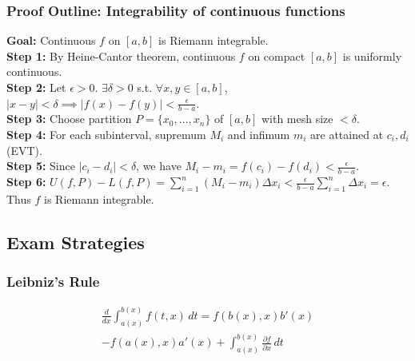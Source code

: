 \subsubsection{Proof Outline: Integrability of continuous functions}
\textbf{Goal:} Continuous $f$ on $[a,b]$ is Riemann integrable. \\
\textbf{Step 1:} By Heine-Cantor theorem, continuous $f$ on compact $[a,b]$ is uniformly continuous. \\
\textbf{Step 2:} Let $\epsilon > 0$. $\exists \delta > 0$ s.t. $\forall x, y \in [a,b]$, $|x-y| < \delta \implies |f(x)-f(y)| < \frac{\epsilon}{b-a}$. \\
\textbf{Step 3:} Choose partition $P = \{x_0, \dots, x_n\}$ of $[a,b]$ with mesh size $< \delta$. \\
\textbf{Step 4:} For each subinterval, supremum $M_i$ and infimum $m_i$ are attained at $c_i, d_i$ (EVT). \\
\textbf{Step 5:} Since $|c_i - d_i| < \delta$, we have $M_i - m_i = f(c_i) - f(d_i) < \frac{\epsilon}{b-a}$. \\
\textbf{Step 6:} $U(f,P) - L(f,P) = \sum_{i=1}^n (M_i - m_i)\Delta x_i < \frac{\epsilon}{b-a} \sum_{i=1}^n \Delta x_i = \epsilon$. Thus $f$ is Riemann integrable.


\subsection{Exam Strategies}

\subsubsection{Leibniz's Rule}
\begin{gather*}
    \frac{d}{dx} \int_{a(x)}^{b(x)} f(t,x) \, dt = f(b(x),x)b'(x) \\
    - f(a(x),x)a'(x) + \int_{a(x)}^{b(x)} \frac{\partial f}{\partial x} \, dt
\end{gather*}
